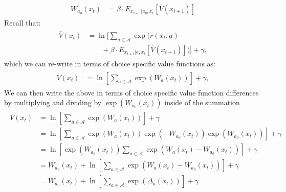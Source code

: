 \documentclass{article}
\begin{document}
\begin{align}
\begin{split}
W_{a_0}(x_t) &= \beta  \cdot E_{x_{t+1}|a_0,x_t} \left[ \overline{V}(x_{t+1}) \right] 
\end{split}
\end{align}
Recall that:
\begin{align} 
\begin{split}
\overline{V}(x_t) &=\ln\bigg[\sum_{a\in\mathcal{A}} \exp\big(r(x_t,a)
\\&\qquad+\beta \cdot E_{x_{t+1}|a,x_t} \left[ \overline{V}(x_{t+1}) \right] \big)\bigg]  +\gamma,
\end{split}
\end{align}
which we can re-write in terms of choice specific value functions as:
\begin{align} 
\begin{split}
\overline{V}(x_t) &=\ln\left[\sum_{a\in\mathcal{A}} \exp\left(W_a(x_t) \right)\right]+\gamma,
\end{split}
\end{align}
We can then write the above in terms of choice specific value function differences by multiplying and dividing by $\exp(W_{a_0}(x_t))$ inside of the summation
\begin{align}
\begin{split}
\overline{V}(x_t) &=\ln\left[\sum_{a\in\mathcal{A}} \exp\left(W_a(x_t) \right)\right]+\gamma
\\&=\ln\left[\sum_{a\in\mathcal{A}} \exp(W_a(x_t))\exp(-W_{a_0}(x_t))\exp(W_{a_0}(x_t))\right]+\gamma
\\&=\ln\left[\exp(W_{a_0}(x_t))\sum_{a\in\mathcal{A}} \exp(W_a(x_t)-W_{a_0}(x_t))\right]+\gamma\\
&=W_{a_0}(x_t)+\ln\left[\sum_{a\in\mathcal{A}} \exp(W_a(x_t)-W_{a_0}(x_t))\right]+\gamma\\
&=W_{a_0}(x_t)+\ln\left[\sum_{a\in\mathcal{A}} \exp(\Delta_a(x_t))\right]+\gamma
\end{split}
\end{align}
\end{document}
